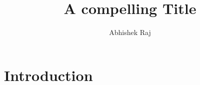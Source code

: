 \documentclass{article}
\title{A compelling Title}
\author{Abhishek Raj}
\begin{document}
\maketitle

\section{Introduction}
\end{document}
